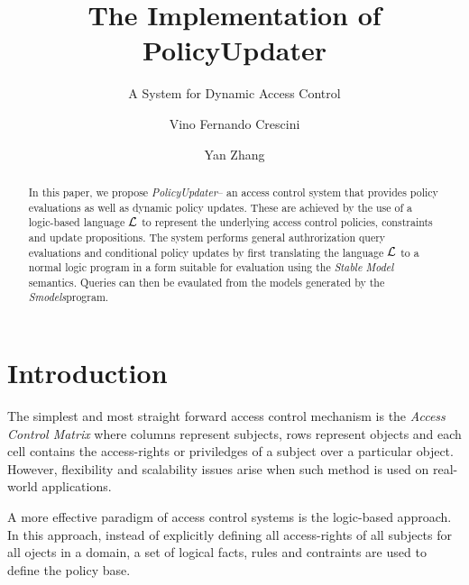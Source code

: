 \documentclass{llncs}
\begin{document}
  \long{}

  \title{The Implementation of PolicyUpdater}
  \subtitle{A System for Dynamic Access Control}

  \author{Vino Fernando Crescini \and Yan Zhang}


  \maketitle

  \begin{abstract}
    In this paper, we propose \emph{PolicyUpdater}\footnotemark -- an access 
    control system that provides policy evaluations as well as dynamic policy 
    updates. These are achieved by the use of a logic-based language $\cal{L}$
    to represent the underlying access control policies, constraints and update
    propositions. The system performs general authrorization query evaluations
    and conditional policy updates by first translating the language $\cal{L}$
    to a normal logic program in a form suitable for evaluation using the
    \emph{Stable Model} semantics. Queries can then be evaulated from the
    models generated by the \emph{Smodels}\footnotemark program.

  \end{abstract}

  \section{Introduction}

    The simplest and most straight forward access control mechanism is the
    \emph{Access Control Matrix} where columns represent subjects, rows
    represent objects and each cell contains the access-rights or priviledges
    of a subject over a particular object. However, flexibility and scalability
    issues arise when such method is used on real-world applications.

    A more effective paradigm of access control systems is the logic-based
    approach. In this approach, instead of explicitly defining all
    access-rights of all subjects for all ojects in a domain, a set of logical
    facts, rules and contraints are used to define the policy base. 
\end{document}

